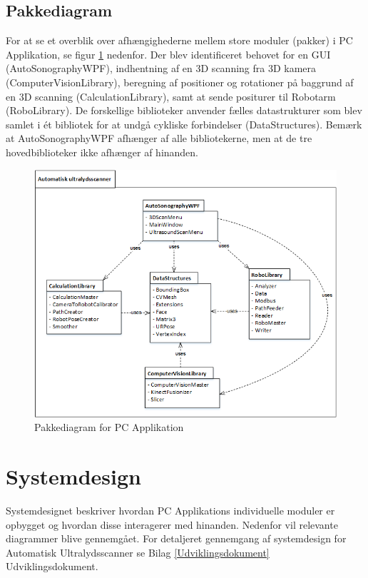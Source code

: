 \subsection{Pakkediagram}
For at se et overblik over afhængighederne mellem store moduler (pakker) i PC Applikation, se figur \ref{pakke} nedenfor. Der blev identificeret behovet for en GUI (AutoSonographyWPF), indhentning af en 3D scanning fra 3D kamera (ComputerVisionLibrary), beregning af positioner og rotationer på baggrund af en 3D scanning (CalculationLibrary), samt at sende positurer til Robotarm (RoboLibrary). \newline
De forskellige biblioteker anvender fælles datastrukturer som blev samlet i ét bibliotek for at undgå cykliske forbindelser (DataStructures). Bemærk at AutoSonographyWPF afhænger af alle bibliotekerne, men at de tre hovedbiblioteker ikke afhænger af hinanden.

\begin{figure}[H]
    \centering
    \includegraphics[width=1\textwidth]{figurer/d/Design/Pakkediagram}
    \caption{Pakkediagram for PC Applikation}
    \label{pakke}
\end{figure}

\newpage
\section{Systemdesign} \label{Systemdesign}
Systemdesignet beskriver hvordan PC Applikations individuelle moduler er opbygget og hvordan disse interagerer med hinanden.  
Nedenfor vil relevante diagrammer blive gennemgået. For detaljeret gennemgang af systemdesign for Automatisk Ultralydsscanner se Bilag \ref{Udviklingsdokument} Udviklingsdokument.


